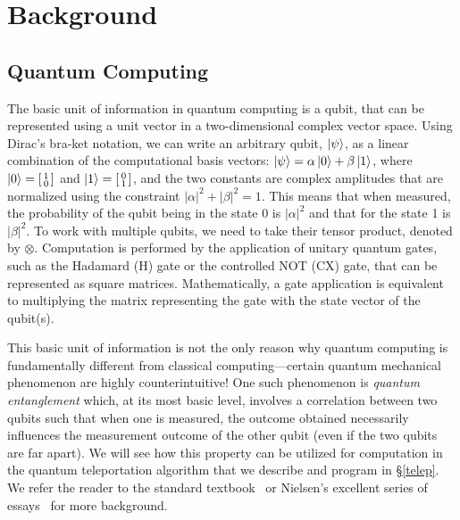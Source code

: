 \documentclass[acmsmall,nonacm,timestamp]{acmart}
\begin{document}
\section{Background}

\subsection{Quantum Computing}
The basic unit of information in quantum computing is a qubit, that can be represented using a unit vector in a two-dimensional complex vector space. Using Dirac's bra-ket notation, we can write an arbitrary qubit, $\ket{\psi}$, as a linear combination of the computational basis vectors: $\ket{\psi} = \alpha\ket{0} + \beta\ket{1}$, where $\ket{0}=\begin{bsmallmatrix}
1 \\
0
\end{bsmallmatrix}$ and $\ket{1}=\begin{bsmallmatrix}
0 \\
1
\end{bsmallmatrix}$, and the two constants are complex amplitudes that are normalized using the constraint $|\alpha|^2 +|\beta|^2 = 1$. This means that when measured, the probability of the qubit being in the state 0 is $|\alpha|^2$ and that for the state 1 is $|\beta|^2$. To work with multiple qubits, we need to take their tensor product, denoted by $\otimes$. Computation is performed by the application of unitary quantum gates, such as the Hadamard (H) gate or the controlled NOT (CX) gate, that can be represented as square matrices. Mathematically, a gate application is equivalent to multiplying the matrix representing the gate with the state vector of the qubit(s).

This basic unit of information is not the only reason why quantum computing is fundamentally different from classical computing---certain quantum mechanical phenomenon are highly counterintuitive! One such phenomenon is \textit{quantum entanglement} which, at its most basic level, involves a correlation between two qubits such that when one is measured, the outcome obtained necessarily influences the measurement outcome of the other qubit (even if the two qubits are far apart). We will see how this property can be utilized for computation in the quantum teleportation algorithm that we describe and program in \S\ref{telep}. We refer the reader to the standard textbook~\cite{nielsen_quantum_2010} or Nielsen's excellent series of essays~\cite{matuschak2019} for more background.
\end{document}
